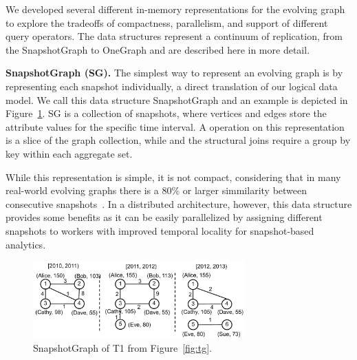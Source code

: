 We developed several different in-memory representations for the
evolving graph to explore the tradeoffs of compactness, parallelism,
and support of different query operators.  The data structures
represent a continuum of replication, from the SnapshotGraph to
OneGraph and are described here in more detail.

{\bf SnapshotGraph (SG).} The simplest way to represent an evolving
graph is by representing each snapshot individually, a direct
translation of our logical data model.  We call this data structure
SnapshotGraph and an example is depicted in Figure~\ref{fig:sgp}.  SG
is a collection of snapshots, where vertices and edges store the
attribute values for the specific time interval.  A 
operation on this representation is a slice of the graph collection,
while  and the structural joins require a group by key
within each aggregate set.

While this representation is simple, it is not compact, considering
that in many real-world evolving graphs there is a 80\% or larger
simmilarity between consecutive
snapshots~\cite{DBLP:journals/tos/MiaoHLWYZPCC15}.  In a distributed
architecture, however, this data structure provides some benefits as
it can be easily parallelized by assigning different snapshots to
workers with improved temporal locality for snapshot-based analytics.

\begin{figure}[t!]
\includegraphics[width=3.2in]{figs/sgp.pdf}
\caption{SnapshotGraph of T1 from Figure~\ref{fig:tg}.}
\label{fig:sgp}
\end{figure}

